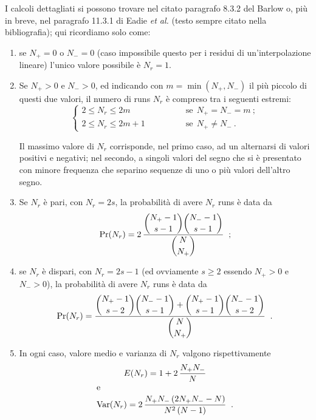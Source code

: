 I calcoli dettagliati si possono trovare nel citato
paragrafo 8.3.2 del Barlow o, pi\`u in breve, nel paragrafo
11.3.1 di Eadie \emph{et al.} (testo sempre citato nella
bibliografia); qui ricordiamo solo come:
\begin{enumerate}
\item se $N_+ = 0$ o $N_- = 0$ (caso impossibile questo per
  i residui di un'interpolazione lineare) l'unico valore
  possibile \`e $N_r = 1$.
\item Se $N_+ > 0$ e $N_- > 0$, ed indicando con $m =
  \min(N_+, N_-)$ il pi\`u piccolo di questi due valori, il
  numero di runs $N_r$ \`e compreso tra i seguenti estremi:
  \begin{equation*}
    \begin{cases}
      2 \le N_r \le 2 m & \qquad \qquad \text{se}~~N_+ =
      N_- = m~; \\[1ex]
      2 \le N_r \le 2 m + 1 & \qquad \qquad \text{se}~~N_+
      \ne N_-~.
    \end{cases}
  \end{equation*}

  Il massimo valore di $N_r$ corrisponde, nel primo caso, ad
  un alternarsi di valori positivi e negativi; nel secondo,
  a singoli valori del segno che si \`e presentato con
  minore frequenza che separino sequenze di uno o pi\`u
  valori dell'altro segno.
\item Se $N_r$ \`e pari, con $N_r = 2s$, la probabilit\`a di
  avere $N_r$ runs \`e data da
  \begin{equation} \label{eq:c.pari}
    \Pr(N_r) = 2 \, \frac{ \displaystyle \binom{N_+ - 1}{s -
        1} \binom{N_- - 1}{s - 1} }{ \displaystyle
      \binom{N}{N_+} } \;\; ;
  \end{equation}
\item se $N_r$ \`e dispari, con $N_r = 2s - 1$ (ed
  ovviamente $s \ge 2$ essendo $N_+>0$ e $N_->0$), la
  probabilit\`a di avere $N_r$ runs \`e data da
  \begin{equation} \label{eq:c.dispari}
    \Pr(N_r) = \frac{ \displaystyle \binom{N_+ - 1}{s - 2}
      \binom{N_- - 1}{s - 1} + \binom{N_+ - 1}{s - 1}
      \binom{N_- - 1}{ s - 2} }{ \displaystyle
      \binom{N}{N_+} } \;\; .
  \end{equation}
\item In ogni caso, valore medio e varianza di $N_r$ valgono
  rispettivamente
  \begin{gather*}
    E( N_r ) = 1 + 2 \, \frac{N_+ N_-}{N} \\
    \intertext{e}
    \operatorname{Var}( N_r ) = 2 \, \frac{N_+ N_- \left( 2 N_+ N_- - N
      \right)}{N^2 \, ( N - 1 )} \;\; .
  \end{gather*}
\end{enumerate}


